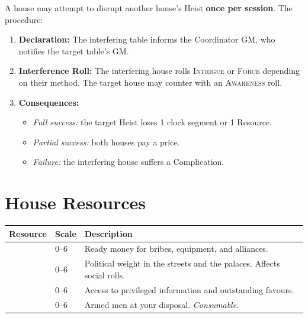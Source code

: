 
A house may attempt to disrupt another house's Heist \textbf{once per session}.
The procedure:

\begin{enumerate}
  \item \textbf{Declaration:} The interfering table informs the Coordinator GM,
        who notifies the target table's GM.
  \item \textbf{Interference Roll:} The interfering house rolls
        \textsc{Intrigue} or \textsc{Force} depending on their method.
        The target house may counter with an \textsc{Awareness} roll.
  \item \textbf{Consequences:}
  \begin{itemize}
    \item \textit{Full success:} the target Heist loses 1 clock segment or 1 Resource.
    \item \textit{Partial success:} both houses pay a price.
    \item \textit{Failure:} the interfering house suffers a Complication.
  \end{itemize}
\end{enumerate}

\section{House Resources}
\label{sec:resources}

\begin{center}
\begin{tabular}{L{2.8cm} C{1.5cm} p{9cm}}
  \toprule
  \textbf{Resource} & \textbf{Scale} & \textbf{Description} \\
  \midrule
          & 0--6 & Ready money for bribes, equipment, and alliances. \\
    & 0--6 & Political weight in the streets and the palaces. Affects social rolls. \\
     & 0--6 & Access to privileged information and outstanding favours. \\
      & 0--6 & Armed men at your disposal. \textit{Consumable.} \\
  \bottomrule
\end{tabular}
\end{center}

